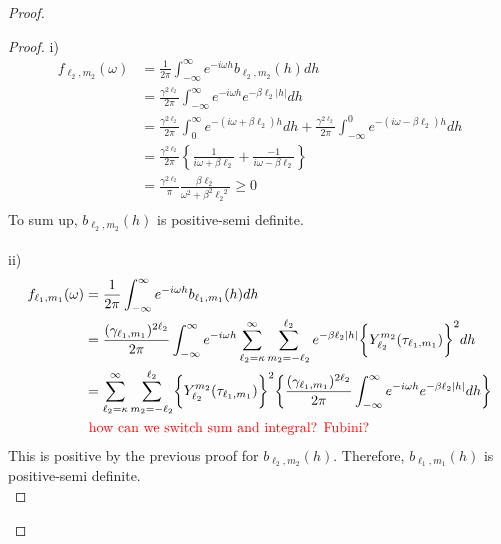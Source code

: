 \documentclass[11pt]{article}
\begin{document}
\begin{itemize}
\begin{proof}
\begin{enumerate}
\begin{proof}
i)\\
\begin{align*}
f_{\ell_2,m_2}(\omega) &= \frac{1}{2\pi} \int_{-\infty}^\infty e^{-i\omega h} b_{\ell_2,m_2}(h) dh\\
&= \frac{\gamma^{2\ell_2}}{2\pi} \int_{-\infty}^\infty e^{-i\omega h} e^{-\beta \ell_2 |h|} dh\\
&= \frac{\gamma^{2\ell_2}}{2\pi} \int_{0}^\infty e^{-(i \omega + \beta \ell_2) h} dh + \frac{\gamma^{2\ell_2}}{2\pi} \int_{-\infty}^0 e^{-(i \omega - \beta \ell_2) h} dh\\
&= \frac{\gamma^{2\ell_2}}{2\pi} \left\{ \frac{1}{i \omega + \beta \ell_2} + \frac{-1}{i \omega - \beta \ell_2} \right\}\\
&= \frac{\gamma^{2\ell_2}}{\pi} \frac{\beta \ell_2}{\omega^2 + \beta^2 {\ell_2}^2} \ge 0\\
\end{align*}
To sum up, $b_{\ell_2,m_2}(h)$ is positive-semi definite.\\
\\
ii)\\
\begin{align*}
f_{\ell_1,m_1}(\omega) &= \frac{1}{2\pi} \int_{-\infty}^\infty e^{-i\omega h} b_{\ell_1,m_1}(h) dh\\
&= \frac{(\gamma_{\ell_1,m_1})^{2 \ell_2}}{2\pi} \int_{-\infty}^\infty e^{-i\omega h} \sum_{\ell_2=\kappa}^{\infty} \sum_{m_2=-\ell_2}^{\ell_2} e^{-\beta \ell_2 |h|} \biggl\{Y_{\ell_2}^{m_2}(\tau_{\ell_1,m_1}) \biggl\}^2 dh\\
&= \sum_{\ell_2=\kappa}^{\infty} \sum_{m_2=-\ell_2}^{\ell_2} \biggl\{Y_{\ell_2}^{m_2}(\tau_{\ell_1,m_1}) \biggl\}^2 \biggl\{  \frac{(\gamma_{\ell_1,m_1})^{2 \ell_2}}{2\pi} \int_{-\infty}^\infty e^{-i\omega h} e^{-\beta \ell_2 |h|} dh \biggl\}\\
&{\color{red} \text{ how can we switch sum and integral? Fubini?}}\\
\end{align*}
This is positive by the previous proof for $b_{\ell_2,m_2}(h)$. Therefore, $b_{\ell_1,m_1}(h)$ is positive-semi definite.\\
\end{proof}


\end{enumerate}
\end{proof}
\end{itemize}
\end{document}
